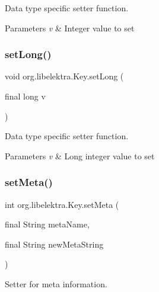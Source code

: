 Data type specific setter function. 


\begin{DoxyParams}{Parameters}
{\em v} & Integer value to set \\
\hline
\end{DoxyParams}
\mbox{\label{classorg_1_1libelektra_1_1Key_ac02de55fc0a3eb10372de7fa146db937}} 
\subsubsection{\texorpdfstring{set\+Long()}{setLong()}}
{\footnotesize\ttfamily void org.\+libelektra.\+Key.\+set\+Long (\begin{DoxyParamCaption}\item[{final long}]{v }\end{DoxyParamCaption})\hspace{0.3cm}{\ttfamily [inline]}}



Data type specific setter function. 


\begin{DoxyParams}{Parameters}
{\em v} & Long integer value to set \\
\hline
\end{DoxyParams}
\mbox{\label{classorg_1_1libelektra_1_1Key_ac8c73ca3d16cf4454bd326ebe469cf2d}} 
\subsubsection{\texorpdfstring{set\+Meta()}{setMeta()}}
{\footnotesize\ttfamily int org.\+libelektra.\+Key.\+set\+Meta (\begin{DoxyParamCaption}\item[{final String}]{meta\+Name,  }\item[{final String}]{new\+Meta\+String }\end{DoxyParamCaption})\hspace{0.3cm}{\ttfamily [inline]}}



Setter for meta information. 



